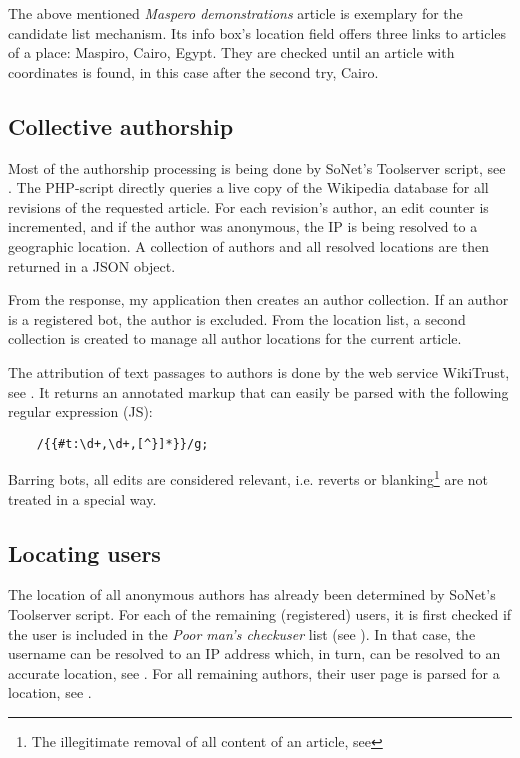 The above mentioned \emph{Maspero demonstrations} article is exemplary for the candidate list mechanism.
Its info box's location field offers three links to articles of a place: Maspiro, Cairo, Egypt.
They are checked until an article with coordinates is found, in this case after the second try, Cairo.

\subsection{Collective authorship}

Most of the authorship processing is being done by SoNet's Toolserver script, see .
The PHP-script directly queries a live copy of the Wikipedia database for all revisions of the requested article.
For each revision's author, an edit counter is incremented, and if the author was anonymous, the IP is being resolved to a geographic location.
A collection of authors and all resolved locations are then returned in a JSON object. 

From the response, my application then creates an author collection.
If an author is a registered bot, the author is excluded.
From the location list, a second collection is created to manage all author locations for the current article. 

The attribution of text passages to authors is done by the web service WikiTrust, see . 
It returns an annotated markup that can easily be parsed with the following regular expression (JS):

\lstset{caption=,label=wikitrustre,language=HTML,numbers=none}
\begin{lstlisting}
	/{{#t:\d+,\d+,[^}]*}}/g;
\end{lstlisting}

Barring bots, all edits are considered relevant, i.e. reverts or blanking\footnote{The illegitimate removal of all content of an article, see } are not treated in a special way.


\subsection{Locating users}

The location of all anonymous authors has already been determined by SoNet's Toolserver script.
For each of the remaining (registered) users, it is first checked if the user is included in the \emph{Poor man's checkuser} list (see ).
In that case, the username can be resolved to an IP address which, in turn, can be resolved to an accurate location, see .
For all remaining authors, their user page is parsed for a location, see .


